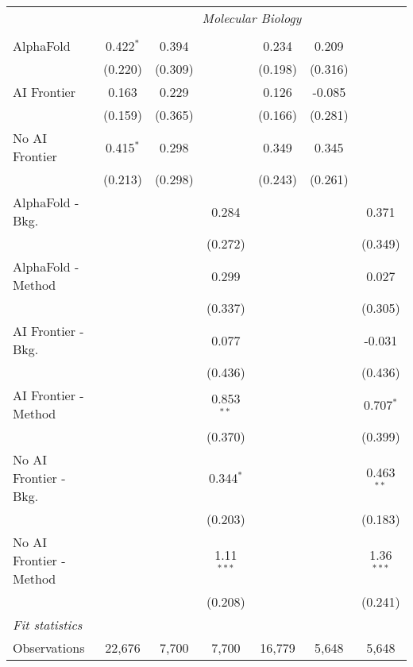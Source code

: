 \begin{tabular}{lcccccc}
 & \multicolumn{6}{c}{\textit{Molecular Biology}} \\ \\
   AlphaFold               & 0.422$^{*}$ & 0.394   &              & 0.234   & 0.209   &   \\   
                           & (0.220)     & (0.309) &              & (0.198) & (0.316) &   \\   
   AI Frontier             & 0.163       & 0.229   &              & 0.126   & -0.085  &   \\   
                           & (0.159)     & (0.365) &              & (0.166) & (0.281) &   \\   
   No AI Frontier          & 0.415$^{*}$ & 0.298   &              & 0.349   & 0.345   &   \\   
                           & (0.213)     & (0.298) &              & (0.243) & (0.261) &   \\   
   AlphaFold - Bkg.        &             &         & 0.284        &         &         & 0.371\\   
                           &             &         & (0.272)      &         &         & (0.349)\\   
   AlphaFold - Method      &             &         & 0.299        &         &         & 0.027\\   
                           &             &         & (0.337)      &         &         & (0.305)\\   
   AI Frontier - Bkg.      &             &         & 0.077        &         &         & -0.031\\   
                           &             &         & (0.436)      &         &         & (0.436)\\   
   AI Frontier - Method    &             &         & 0.853$^{**}$ &         &         & 0.707$^{*}$\\   
                           &             &         & (0.370)      &         &         & (0.399)\\   
   No AI Frontier - Bkg.   &             &         & 0.344$^{*}$  &         &         & 0.463$^{**}$\\   
                           &             &         & (0.203)      &         &         & (0.183)\\   
   No AI Frontier - Method &             &         & 1.11$^{***}$ &         &         & 1.36$^{***}$\\   
                           &             &         & (0.208)      &         &         & (0.241)\\   
   \midrule
   \emph{Fit statistics}\\
   Observations            & 22,676      & 7,700   & 7,700        & 16,779  & 5,648   & 5,648\\  
   

\end{tabular}
